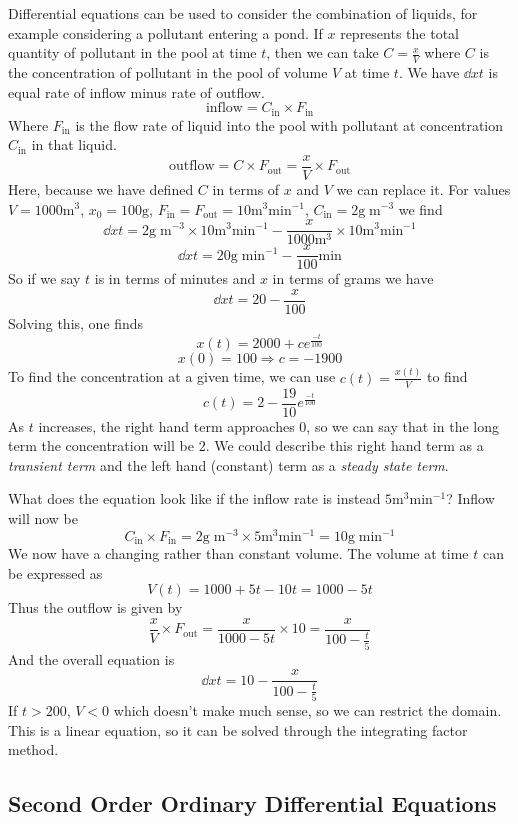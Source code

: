 \documentclass[12pt]{report}
\begin{document}
\begin{flushleft}
Differential equations can be used to consider the combination of liquids, for
example considering a pollutant entering a pond. If \(x\) represents the total
quantity of pollutant in the pool at time \(t\), then we can take
\(C = \frac{x}{V}\) where \(C\) is the concentration of pollutant in the pool
of volume \(V\) at time \(t\). We have \(\dd{x}{t}\) is equal rate of inflow
minus rate of outflow.
\[\mathrm{inflow} = C_\mathrm{in}\times F_\mathrm{in}\]
Where \(F_\mathrm{in}\) is the flow rate of liquid into the pool with pollutant
at concentration \(C_\mathrm{in}\) in that liquid.
\[\mathrm{outflow} = C\times F_\mathrm{out} =\frac{x}{V}\times F_\mathrm{out}\]
Here, because we have defined \(C\) in terms of \(x\) and \(V\) we can replace
it. For values \(V = 1000\mathrm{m^3}\), \(x_0 = 100\mathrm{g}\), 
\(F_\mathrm{in} = F_\mathrm{out} = 10\mathrm{m^3min^{-1}}\), 
\(C_\mathrm{in} = 2\mathrm{g\;m}^{-3}\) we find
\[\dd{x}{t} = 2\mathrm{g\;m}^{-3}\times10\mathrm{m^3min^{-1}} 
- \frac{x}{1000\mathrm{m}^3}\times10\mathrm{m^3min^{-1}}\]
\[\dd{x}{t} = 20\mathrm{g\;min}^{-1} - \frac{x}{100}\mathrm{min}\]
So if we say \(t\) is in terms of minutes and \(x\) in terms of grams we have
\[\dd{x}{t} = 20 - \frac{x}{100}\]
Solving this, one finds
\[x(t) = 2000 + ce^{\frac{-t}{100}}\]
\[x(0) = 100 \Rightarrow c = -1900\]
To find the concentration at a given time, we can use \(c(t) = \frac{x(t)}{V}\)
to find
\[c(t) = 2 - \frac{19}{10}e^{\frac{-t}{100}}\]
As \(t\) increases, the right hand term approaches \(0\), so we can say that in
the long term the concentration will be \(2\). We could describe this right
hand term as a \textit{transient term} and the left hand (constant) term as a
\textit{steady state term}. \par
What does the equation look like if the inflow rate is instead
\(5\mathrm{m^3min^{-1}}\)? Inflow will now be
\[C_\mathrm{in} \times F_\mathrm{in} 
= 2\mathrm{g\;m^{-3}}\times5\mathrm{m^3min^{-1}} = 10\mathrm{g\;min^{-1}}\]
We now have a changing rather than constant volume. The volume at time
\(t\) can be expressed as
\[V(t) = 1000 + 5t - 10t = 1000 - 5t\]
Thus the outflow is given by
\[\frac{x}{V} \times F_\mathrm{out} = \frac{x}{1000 - 5t}\times10 
= \frac{x}{100 - \frac{t}{5}}\]
And the overall equation is
\[\dd{x}{t} = 10 - \frac{x}{100 - \frac{t}{5}}\]
If \(t > 200\), \(V < 0\) which doesn't make much sense, so we can restrict the
domain. This is a linear equation, so it can be solved through the integrating
factor method.

\subsection*{Second Order Ordinary Differential Equations}


\end{flushleft}
\end{document}
